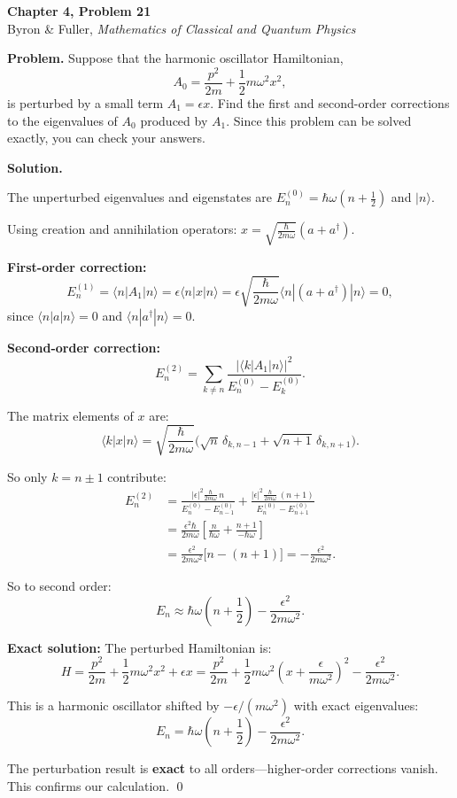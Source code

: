 \documentclass[12pt]{article}
\begin{document}
\begin{center}
{\Large\bfseries Chapter 4, Problem 21}\\[6pt]
Byron \& Fuller, \textit{Mathematics of Classical and Quantum Physics}
\end{center}

\bigskip

\textbf{Problem.} Suppose that the harmonic oscillator Hamiltonian,
\[
A_0 = \frac{p^2}{2m} + \frac{1}{2}m\omega^2 x^2,
\]
is perturbed by a small term $A_1 = \epsilon x$. Find the first and second-order corrections to the eigenvalues of $A_0$ produced by $A_1$. Since this problem can be solved exactly, you can check your answers.

\bigskip
\textbf{Solution.}

The unperturbed eigenvalues and eigenstates are $E_n^{(0)} = \hbar\omega(n+\tfrac{1}{2})$ and $|n\rangle$.

Using creation and annihilation operators: $x = \sqrt{\frac{\hbar}{2m\omega}}(a + a^\dagger)$.

\textbf{First-order correction:}
\[
E_n^{(1)} = \langle n|A_1|n\rangle = \epsilon\langle n|x|n\rangle = \epsilon\sqrt{\frac{\hbar}{2m\omega}}\langle n|(a+a^\dagger)|n\rangle = 0,
\]
since $\langle n|a|n\rangle = 0$ and $\langle n|a^\dagger|n\rangle = 0$.

\textbf{Second-order correction:}
\[
E_n^{(2)} = \sum_{k \neq n} \frac{|\langle k|A_1|n\rangle|^2}{E_n^{(0)} - E_k^{(0)}}.
\]

The matrix elements of $x$ are:
\[
\langle k|x|n\rangle = \sqrt{\frac{\hbar}{2m\omega}}\bigl(\sqrt{n}\,\delta_{k,n-1} + \sqrt{n+1}\,\delta_{k,n+1}\bigr).
\]

So only $k = n\pm 1$ contribute:
\begin{align*}
E_n^{(2)} &= \frac{|\epsilon|^2\frac{\hbar}{2m\omega}\,n}{E_n^{(0)} - E_{n-1}^{(0)}} + \frac{|\epsilon|^2\frac{\hbar}{2m\omega}\,(n+1)}{E_n^{(0)} - E_{n+1}^{(0)}} \\[6pt]
&= \frac{\epsilon^2\hbar}{2m\omega}\left[\frac{n}{\hbar\omega} + \frac{n+1}{-\hbar\omega}\right] \\[6pt]
&= \frac{\epsilon^2}{2m\omega^2}\bigl[n - (n+1)\bigr] = -\frac{\epsilon^2}{2m\omega^2}.
\end{align*}

So to second order:
\[
\boxed{E_n \approx \hbar\omega\!\left(n + \frac{1}{2}\right) - \frac{\epsilon^2}{2m\omega^2}}.
\]

\textbf{Exact solution:} The perturbed Hamiltonian is:
\[
H = \frac{p^2}{2m} + \frac{1}{2}m\omega^2 x^2 + \epsilon x = \frac{p^2}{2m} + \frac{1}{2}m\omega^2\!\left(x + \frac{\epsilon}{m\omega^2}\right)^2 - \frac{\epsilon^2}{2m\omega^2}.
\]

This is a harmonic oscillator shifted by $-\epsilon/(m\omega^2)$ with exact eigenvalues:
\[
E_n = \hbar\omega\!\left(n + \frac{1}{2}\right) - \frac{\epsilon^2}{2m\omega^2}.
\]

The perturbation result is \textbf{exact} to all orders---higher-order corrections vanish. This confirms our calculation. \qed
\end{document}
